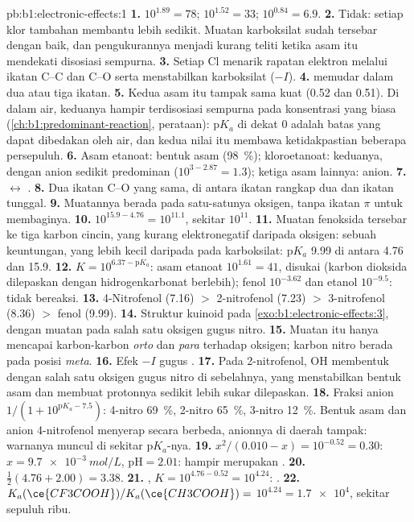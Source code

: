 \begin{solution}{pb:b1:electronic-effects:1}
\textbf{1.} $10^{1.89} = 78$; $10^{1.52} = 33$; $10^{0.84} = 6.9$.
\textbf{2.} Tidak: setiap klor tambahan membantu lebih sedikit. Muatan
karboksilat sudah tersebar dengan baik, dan pengukurannya menjadi kurang
teliti ketika asam itu mendekati disosiasi sempurna.
\textbf{3.} Setiap Cl menarik rapatan elektron melalui ikatan C--C dan
C--O serta menstabilkan karboksilat ($-I$).
\textbf{4.}  memudar dalam dua atau tiga ikatan.
\textbf{5.} Kedua asam itu tampak sama kuat (0.52 dan 0.51). Di dalam air,
keduanya hampir terdisosiasi sempurna pada konsentrasi yang biasa
(\cref{ch:b1:predominant-reaction}, perataan): $\mathrm{p}K_a$ di dekat 0
adalah batas yang dapat dibedakan oleh air, dan kedua nilai itu membawa
ketidakpastian beberapa persepuluh.
\textbf{6.} Asam etanoat: bentuk asam (\qty{98}{\percent}); kloroetanoat:
keduanya, dengan anion sedikit predominan ($10^{3 - 2.87} = 1.3$); ketiga
asam lainnya: anion.
\textbf{7.}  $\leftrightarrow$ .
\textbf{8.} Dua ikatan C--O yang sama, di antara ikatan rangkap dua dan
ikatan tunggal.
\textbf{9.} Muatannya berada pada satu-satunya oksigen, tanpa ikatan
$\pi$ untuk membaginya.
\textbf{10.} $10^{15.9 - 4.76} = 10^{11.1}$, sekitar $10^{11}$.
\textbf{11.} Muatan fenoksida tersebar ke tiga karbon cincin, yang kurang
elektronegatif daripada oksigen: sebuah keuntungan, yang lebih kecil
daripada pada karboksilat: $\mathrm{p}K_a$ 9.99 di antara 4.76 dan 15.9.
\textbf{12.} $K = 10^{6.37 - \mathrm{p}K_a}$: asam etanoat $10^{1.61} = 41$,
disukai (karbon dioksida dilepaskan dengan hidrogenkarbonat berlebih);
fenol $10^{-3.62}$ dan etanol $10^{-9.5}$: tidak bereaksi.
\textbf{13.} 4-Nitrofenol (7.16) $>$ 2-nitrofenol (7.23) $>$ 3-nitrofenol
(8.36) $>$ fenol (9.99).
\textbf{14.} Struktur kuinoid pada \cref{exo:b1:electronic-effects:3},
dengan muatan pada salah satu oksigen gugus nitro.
\textbf{15.} Muatan itu hanya mencapai karbon-karbon \textit{orto} dan
\textit{para} terhadap oksigen; karbon nitro berada pada posisi
\textit{meta}.
\textbf{16.} Efek $-I$ gugus .
\textbf{17.} Pada 2-nitrofenol, OH membentuk  dengan salah
satu oksigen gugus nitro di sebelahnya, yang menstabilkan bentuk asam
dan membuat protonnya sedikit lebih sukar dilepaskan.
\textbf{18.} Fraksi anion $1/(1 + 10^{\mathrm{p}K_a - 7.5})$: 4-nitro
\qty{69}{\percent}, 2-nitro \qty{65}{\percent}, 3-nitro
\qty{12}{\percent}. Bentuk asam dan anion 4-nitrofenol menyerap secara
berbeda, anionnya di daerah tampak: warnanya muncul di sekitar
$\mathrm{p}K_a$-nya.
\textbf{19.} $x^2/(0.010 - x) = 10^{-0.52} = 0.30$: $x = \qty{9.7e-3}{mol/L}$,
$\mathrm{pH} = 2.01$: hampir merupakan .
\textbf{20.} $\frac12(4.76 + 2.00) = 3.38$.
\textbf{21.} , $K = 10^{4.76 -
0.52} = 10^{4.24}$: .
\textbf{22.} $K_a(\ce{CF3COOH})/K_a(\ce{CH3COOH}) =$ \textbf{$10^{4.24} =
\num{1.7e4}$}, sekitar sepuluh ribu.
\end{solution}

